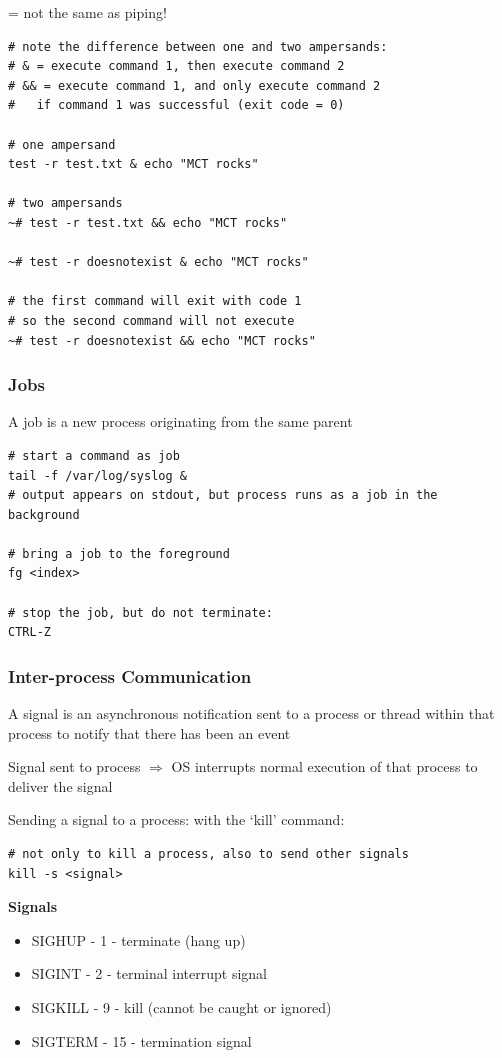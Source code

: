\documentclass{article}
\begin{document}
= not the same as piping!

\begin{verbatim}
# note the difference between one and two ampersands:
# & = execute command 1, then execute command 2
# && = execute command 1, and only execute command 2 
#   if command 1 was successful (exit code = 0)

# one ampersand
test -r test.txt & echo "MCT rocks"

# two ampersands
~# test -r test.txt && echo "MCT rocks"

~# test -r doesnotexist & echo "MCT rocks"

# the first command will exit with code 1
# so the second command will not execute
~# test -r doesnotexist && echo "MCT rocks"
\end{verbatim}

\subsubsection{Jobs}

A job is a new process originating from the same parent

\begin{verbatim}
# start a command as job
tail -f /var/log/syslog &
# output appears on stdout, but process runs as a job in the background

# bring a job to the foreground
fg <index>

# stop the job, but do not terminate:
CTRL-Z
\end{verbatim}


\subsubsection{Inter-process Communication}

A signal is an asynchronous notification sent to a process or thread within that process
to notify that there has been an event

Signal sent to process $\Rightarrow$ OS interrupts normal execution of that process to deliver the signal

Sending a signal to a process: with the `kill' command:

\begin{verbatim}
# not only to kill a process, also to send other signals
kill -s <signal>
\end{verbatim}

\textbf{Signals}

\begin{itemize}
    \item SIGHUP - 1 - terminate (hang up)
    \item SIGINT - 2 - terminal interrupt signal
    \item SIGKILL - 9 - kill (cannot be caught or ignored)
    \item SIGTERM - 15 - termination signal
\end{itemize}
\end{document}
